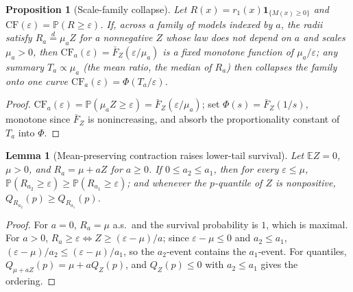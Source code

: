 \documentclass{article}
\newtheorem{lemma}{Lemma}
\newtheorem{proposition}{Proposition}
\theoremstyle{definition}
\begin{document}
\begin{proposition}[Scale-family collapse]\label{prop:scalefam}
Let $R(x)=r_1(x)\mathbf 1_{\{M(x)\ge0\}}$ and $\mathrm{CF}(\varepsilon)=\mathbb P(R\ge\varepsilon)$. If, across a family of models indexed by $a$, the radii satisfy $R_a\overset d=\mu_aZ$ for a nonnegative $Z$ whose law does not depend on $a$ and scales $\mu_a>0$, then $\mathrm{CF}_a(\varepsilon)=\bar F_Z(\varepsilon/\mu_a)$ is a fixed monotone function of $\mu_a/\varepsilon$; any summary $T_a\propto\mu_a$ (the mean ratio, the median of $R_a$) then collapses the family onto one curve $\mathrm{CF}_a(\varepsilon)=\Phi(T_a/\varepsilon)$.
\end{proposition}
\begin{proof}
$\mathrm{CF}_a(\varepsilon)=\mathbb P(\mu_aZ\ge\varepsilon)=\bar F_Z(\varepsilon/\mu_a)$; set $\Phi(s)=\bar F_Z(1/s)$, monotone since $\bar F_Z$ is nonincreasing, and absorb the proportionality constant of $T_a$ into $\Phi$.
\end{proof}

\begin{lemma}[Mean-preserving contraction raises lower-tail survival]\label{lem:mpc}
Let $\mathbb EZ=0$, $\mu>0$, and $R_a=\mu+aZ$ for $a\ge0$. If $0\le a_2\le a_1$, then for every $\varepsilon\le\mu$, $\mathbb P(R_{a_2}\ge\varepsilon)\ge\mathbb P(R_{a_1}\ge\varepsilon)$; and whenever the $p$-quantile of $Z$ is nonpositive, $Q_{R_{a_2}}(p)\ge Q_{R_{a_1}}(p)$.
\end{lemma}
\begin{proof}
For $a=0$, $R_a=\mu$ a.s.\ and the survival probability is $1$, which is maximal. For $a>0$, $R_a\ge\varepsilon\iff Z\ge(\varepsilon-\mu)/a$; since $\varepsilon-\mu\le0$ and $a_2\le a_1$, $(\varepsilon-\mu)/a_2\le(\varepsilon-\mu)/a_1$, so the $a_2$-event contains the $a_1$-event. For quantiles, $Q_{\mu+aZ}(p)=\mu+aQ_Z(p)$, and $Q_Z(p)\le0$ with $a_2\le a_1$ gives the ordering.
\end{proof}
\end{document}
